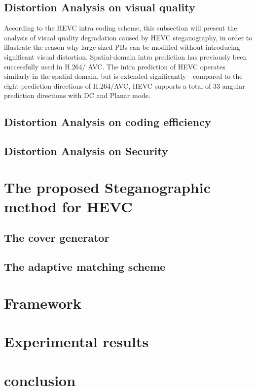 \documentclass[journal,sort]{IEEEtran}
\begin{document}
\subsection{Distortion Analysis on visual quality}
According to the HEVC intra coding scheme, this subsection will present the analysis of visual quality degradation caused by HEVC steganography, in order to illustrate the reason why large-sized PBs can be modified without introducing significant visual distortion.
Spatial-domain intra prediction has previously been successfully used in H.264/ AVC. The intra prediction of HEVC operates similarly in the spatial domain, but is extended significantly—compared to the eight prediction directions of H.264/AVC, HEVC supports a total of 33 angular prediction directions with DC and Planar mode.

\subsection{Distortion Analysis on coding efficiency}
\subsection{Distortion Analysis on Security}
\section{The proposed Steganographic method for HEVC}

\subsection{The cover generator}

\subsection{The adaptive matching scheme}
\section{Framework}



\section{Experimental results}
\section{conclusion}




	
	
	
	
	
	
	
\end{document}
